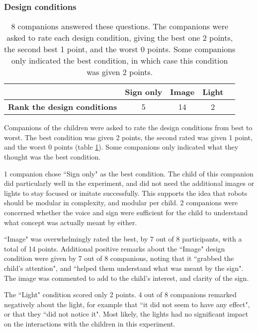 \subsubsection{Design conditions}

\begin{table}
  \centering
  \renewcommand{\arraystretch}{1.2}
  \begin{tabular}{|p{4cm}|c|c|c|c|}
    \hline
     & 
    \textbf{Sign only} &
    \textbf{Image} &
    \textbf{Light}\\\hline
    \textbf{Rank the design conditions} & 5 & 14 & 2\\ \hline
  \end{tabular}
  
  \caption{8 companions answered these questions. The companions were asked to rate each design condition, giving the best one 2 points, the second best 1 point, and the worst 0 points. Some companions only indicated the best condition, in which case this condition was given 2 points.}
  \label{table:designConditions}
\end{table}

Companions of the children were asked to rate the design conditions from best to worst. The best condition was given 2 points, the second rated was given 1 point, and the worst 0 points (table \ref{table:designConditions}). Some companions only indicated what they thought was the best condition. 

1 companion chose ``Sign only" as the best condition. The child of this companion did particularly well in the experiment, and did not need the additional images or lights to stay focused or imitate successfully. This supports the idea that robots should be modular in complexity, and modular per child. 2 companions were concerned whether the voice and sign were sufficient for the child to understand what concept was actually meant by either.

``Image" was overwhelmingly rated the best, by 7 out of 8 participants, with a total of 14 points. Additional positive remarks about the ``Image" design condition were given by 7 out of 8 companions, noting that it ``grabbed the child's attention", and ``helped them understand what was meant by the sign". The image was commented to add to the child's interest, and clarity of the sign.

The ``Light" condition scored only 2 points. 4 out of 8 companions remarked negatively about the light, for example that ``it did not seem to have any effect", or that they ``did not notice it". Most likely, the lights had no significant impact on the interactions with the children in this experiment.


